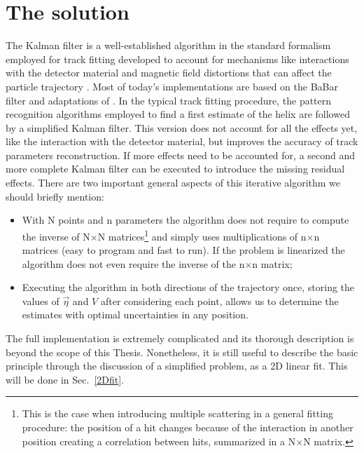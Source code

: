 \section{The solution}
    The Kalman filter is a well-established algorithm in the standard formalism employed for track fitting developed to account for mechanisms like interactions with the detector material and magnetic field distortions that can affect the particle trajectory \cite{Kalman:1984}\cite{Kalman:1987}. 
    Most of today's implementations are based on the BaBar filter and adaptations of \cite{Kalman}\cite{Kalman:1987}.
    In the typical track fitting procedure, the pattern recognition algorithms employed to find a first estimate of the helix are followed by a simplified Kalman filter. 
    This version does not account for all the effects yet, like the interaction with the detector material, but improves the accuracy of track parameters reconstruction. 
    If more effects need to be accounted for, a second and more complete Kalman filter can be executed to introduce the missing residual effects. 
    There are two important general aspects of this iterative algorithm we should briefly mention: 
    \begin{itemize}
        \item With N points and n parameters the algorithm does not require to compute the inverse of N$\times$N matrices\footnote{This is the case when introducing multiple scattering in a general fitting procedure: the position of a hit changes because of the interaction in another position creating a correlation between hits, summarized in a N$\times$N matrix.} and simply uses multiplications of n$\times$n matrices (easy to program and fast to run).
        If the problem is linearized the algorithm does not even require the inverse of the n$\times$n matrix;
        \item Executing the algorithm in both directions of the trajectory once, storing the values of $\vec{\eta}$ and $V$ after considering each point, allows us to determine the estimates with optimal uncertainties in any position.
    \end{itemize} 
    The full implementation is extremely complicated and its thorough description is beyond the scope of this Thesis. 
    Nonetheless, it is still useful to describe the basic principle through the discussion of a simplified problem, as a 2D linear fit. 
    This will be done in Sec.~\ref{2Dfit}.

